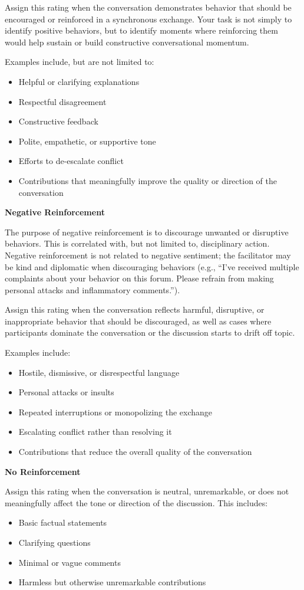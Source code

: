 \documentclass[11pt]{article}
\theoremstyle{definition}
\theoremstyle{plain}
\begin{document}
Assign this rating when the conversation demonstrates behavior that should be encouraged or reinforced in a synchronous exchange. Your task is not simply to identify positive behaviors, but to identify moments where reinforcing them would help sustain or build constructive conversational momentum.

Examples include, but are not limited to:
\begin{itemize}
	\item Helpful or clarifying explanations
	\item Respectful disagreement
	\item Constructive feedback
	\item Polite, empathetic, or supportive tone
	\item Efforts to de-escalate conflict
	\item Contributions that meaningfully improve the quality or direction of the conversation
\end{itemize}

\textbf{Negative Reinforcement}

The purpose of negative reinforcement is to discourage unwanted or disruptive behaviors. This is correlated with, but not limited to, disciplinary action. Negative reinforcement is not related to negative sentiment; the facilitator may be kind and diplomatic when discouraging behaviors (e.g., ``I've received multiple complaints about your behavior on this forum. Please refrain from making personal attacks and inflammatory comments.'').

Assign this rating when the conversation reflects harmful, disruptive, or inappropriate behavior that should be discouraged, as well as cases where participants dominate the conversation or the discussion starts to drift off topic.

Examples include:
\begin{itemize}
	\item Hostile, dismissive, or disrespectful language
	\item Personal attacks or insults
	\item Repeated interruptions or monopolizing the exchange
	\item Escalating conflict rather than resolving it
	\item Contributions that reduce the overall quality of the conversation
\end{itemize}

\textbf{No Reinforcement}

Assign this rating when the conversation is neutral, unremarkable, or does not meaningfully affect the tone or direction of the discussion. This includes:
\begin{itemize}
	\item Basic factual statements
	\item Clarifying questions
	\item Minimal or vague comments
	\item Harmless but otherwise unremarkable contributions
\end{itemize}
\end{document}
